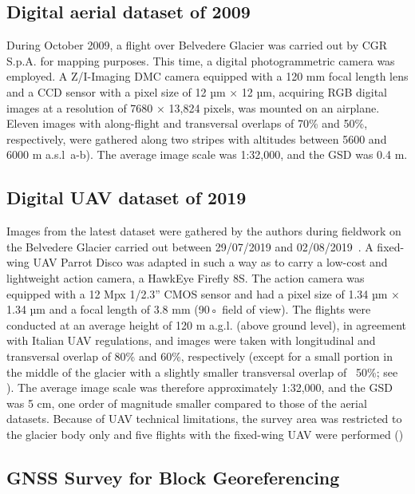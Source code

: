 \subsection{Digital aerial dataset of 2009}

During October 2009, a flight over Belvedere Glacier was carried out by CGR S.p.A. for mapping purposes. 
This time, a digital photogrammetric camera was employed.
A Z/I-Imaging DMC camera equipped with a 120 mm focal length lens and a CCD
sensor with a pixel size of 12 µm × 12 µm, acquiring RGB digital images at a resolution of
7680 × 13,824 pixels, was mounted on an airplane. 
Eleven images with along-flight and transversal overlaps of 70\% and 50\%, respectively, were gathered along two stripes with altitudes between 5600 and 6000 m a.s.l~a-b). 
The average image scale was 1:32,000, and the GSD was 0.4 m.

\subsection{Digital UAV dataset of 2019}

Images from the latest dataset were gathered by the authors during fieldwork on the
Belvedere Glacier carried out between 29/07/2019 and 02/08/2019~\citep{Ioli2022}. 
A fixed-wing UAV Parrot Disco was adapted in such a way as to carry a low-cost and lightweight action
camera, a HawkEye Firefly 8S. 
The action camera was equipped with a 12 Mpx 1/2.3” CMOS sensor and had a pixel size of 1.34 µm × 1.34 µm and a focal length of 3.8 mm (90◦ field of view). 
The flights were conducted at an average height of 120 m a.g.l. (above ground level), in agreement with Italian UAV regulations, and images were taken with longitudinal and transversal overlap of 80\% and 60\%, respectively (except for a small portion in the middle of the glacier with a slightly smaller transversal overlap of ~50\%; see ).
The average image scale was therefore approximately 1:32,000, and the GSD was 5 cm, one order of magnitude smaller compared to those of the aerial datasets. 
Because of UAV technical limitations, the survey area was restricted to the glacier body only and five flights with the fixed-wing UAV were performed ()


\subsection{GNSS Survey for Block Georeferencing}

